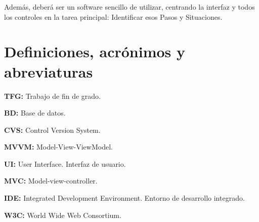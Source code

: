 Adem\'as, deber\'a ser un software sencillo de utilizar, centrando la interfaz y todos los controles en la tarea principal:
Identificar esos Pasos y Situaciones.

\section{Definiciones, acr\'{o}nimos y abreviaturas}
\textbf{TFG:} Trabajo de fin de grado.

\textbf{BD:} Base de datos.

\textbf{CVS:} Control Version System.

\textbf{MVVM:} Model-View-ViewModel.

\textbf{UI:} User Interface. Interfaz de usuario.

\textbf{MVC:} Model-view-controller.

\textbf{IDE:} Integrated Development Environment. Entorno de desarrollo integrado.

\textbf{W3C:} World Wide Web Consortium.
 
